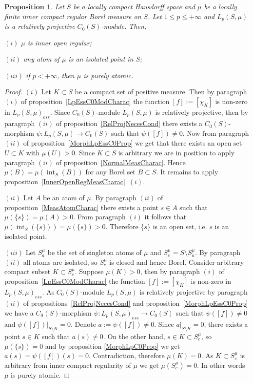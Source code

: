 \documentclass[12pt]{article}
\newtheorem{proposition}[theorem]{Proposition}
\begin{document}
\begin{proposition}\label{LpC0ModNecessCond} Let $S$ be a locally compact
    Hausdorff space and $\mu$ be a locally finite inner compact regular Borel
    measure on $S$. Let $1\leq p\leq +\infty$ and $L_p(S,\mu)$ is a relatively
    projective $C_0(S)$-module. Then,

    $(i)$ $\mu$ is inner open regular;

    $(ii)$ any atom of $\mu$ is an isolated point in $S$;

    $(iii)$ if $p<+\infty$, then $\mu$ is purely atomic.
\end{proposition}
\begin{proof} $(i)$ Let $K\subset S$ be a compact set of positive measure.
    Then by paragraph $(i)$ of proposition~\ref{LpEssC0ModCharac} the function
    $[f]:=[\chi_K]$ is non-zero in ${L_p(S,\mu)}_{ess}$. Since $C_0(S)$-module
    $L_p(S,\mu)$ is relatively projective, then by paragraph $(ii)$ of
    proposition~\ref{RelProjNecesCond} there exists a $C_0(S)$-morphism
    $\psi:L_p(S,\mu)\to C_0(S)$ such that $\psi([f])\neq 0$. Now from paragraph
    $(ii)$ of proposition~\ref{MorphLpEssC0Prop} we get that there exists an
    open set $U\subset K$ with $\mu(U)>0$. Since $K\subset S$ is arbitrary we
    are in position to apply paragraph $(ii)$ of
    proposition~\ref{NormalMeasCharac}. Hence
    $\mu(B)=\mu(\operatorname{int}_S(B))$ for any Borel set $B\subset S$. It
    remains to apply proposition~\ref{InnerOpenRegMeasCharac}~$(i)$.

    $(ii)$ Let $A$ be an atom of $\mu$. By paragraph $(ii)$ of
    proposition~\ref{MeasAtomCharac} there exists a point $s\in A$ such that
    $\mu(\{s\})=\mu(A)>0$. From paragraph $(i)$ it follows that
    $\mu(\operatorname{int}_S(\{s\}))=\mu(\{s\})>0$. Therefore $\{s\}$ is an
    open set, i.e. $s$ is an isolated point.

    $(iii)$ Let $S_a^\mu$ be the set of singleton atoms of $\mu$ and
    $S_c^\mu=S\setminus S_a^\mu$. By paragraph $(ii)$ all atoms are isolated, so
    $S_c^\mu$ is closed and hence Borel. Consider arbitrary compact subset
    $K\subset S_c^\mu$. Suppose $\mu(K)>0$, then by paragraph $(i)$ of
    proposition~\ref{LpEssC0ModCharac} the function $[f]:=[\chi_K]$ is non-zero
    in ${L_p(S,\mu)}_{ess}$. As $C_0(S)$-module $L_p(S, \mu)$ is relatively
    projective by paragraph $(ii)$ of propositions~\ref{RelProjNecesCond} and
    proposition~\ref{MorphLpEssC0Prop} we have a $C_0(S)$-morphism
    $\psi:{L_p(S,\mu)}_{ess}\to C_0(S)$ such that $\psi([f])\neq 0$ and
    $\psi([f])|_{S\setminus K}=0$. Denote $a:=\psi([f])\neq 0$. Since
    $a|_{S\setminus K}=0$, there exists a point $s\in K$ such that $a(s)\neq 0$.
    On the other hand, $s\in K\subset S_c^{\mu}$, so $\mu(\{s\})=0$ and by 
    proposition \ref{MorphLpC0Prop} we get $a(s)=\psi([f])(s)=0$. Contradiction, 
    therefore $\mu(K)=0$. As $K\subset S_c^\mu$ is arbitrary
    from inner compact regularity of $\mu$ we get $\mu(S_c^\mu)=0$. In other
    words $\mu$ is purely atomic.
\end{proof}
\end{document}
